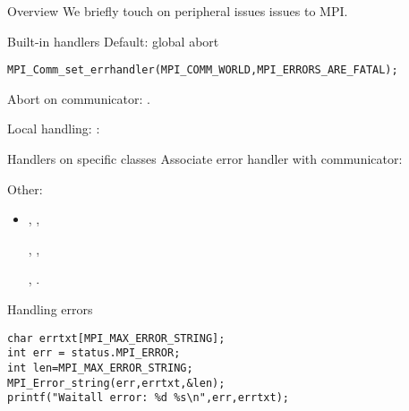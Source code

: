 
\begin{numberedframe}{Overview}
  We briefly touch on peripheral issues issues to MPI.
\end{numberedframe}


\begin{numberedframe}{Built-in handlers}
  \label{sl:errhandler}
Default: global abort
\begin{lstlisting}
MPI_Comm_set_errhandler(MPI_COMM_WORLD,MPI_ERRORS_ARE_FATAL);
\end{lstlisting}

\begin{mpifour}
  Abort on communicator: .
\end{mpifour}
  
Local handling: :
\end{numberedframe}

\begin{numberedframe}{Handlers on specific classes}
Associate error handler with communicator:\\
   

  Other:
\begin{itemize}
\item  {},
  ,
\begin{mpifour}
  ,
  ,
\end{mpifour}
  ,
  .
\end{itemize}  
\end{numberedframe}

\begin{numberedframe}{Handling errors}
\begin{lstlisting}
char errtxt[MPI_MAX_ERROR_STRING];
int err = status.MPI_ERROR;
int len=MPI_MAX_ERROR_STRING;
MPI_Error_string(err,errtxt,&len);
printf("Waitall error: %d %s\n",err,errtxt);    
\end{lstlisting}
\end{numberedframe}

